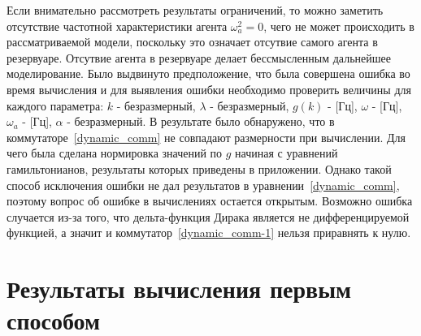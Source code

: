 Если внимательно рассмотреть результаты ограничений, то можно заметить отсутствие частотной характеристики
агента $\omega^{2}_{a} = 0$, чего не может происходить в рассматриваемой модели, поскольку это означает
отсутвие самого агента в резервуаре.
Отсутвие агента в резервуаре делает бессмысленным дальнейшее моделирование.
Было выдвинуто предположение, что была совершена ошибка во время вычисления и для выявления ошибки
необходимо проверить величины для каждого параметра: $k$ - безразмерный, $\lambda$ - безразмерный,
$g(k)$ - [Гц], $\omega$ - [Гц], $\omega_{a}$ - [Гц], $\alpha$ - безразмерный.
В результате было обнаружено, что в коммутаторе~\eqref{dynamic_comm} не совпадают размерности при вычислении.
Для чего была сделана нормировка значений по $g$ начиная с уравнений гамильтонианов, результаты которых
приведены в приложении.
Однако такой способ исключения ошибки не дал результатов в уравнении~\eqref{dynamic_comm}, поэтому
вопрос об ошибке в вычислениях остается открытым.
Возможно ошибка случается из-за того, что дельта-функция Дирака является не дифференцируемой функцией,
а значит и коммутатор~\eqref{dynamic_comm-1} нельзя приравнять к нулю.

\section{Результаты вычисления первым способом}

